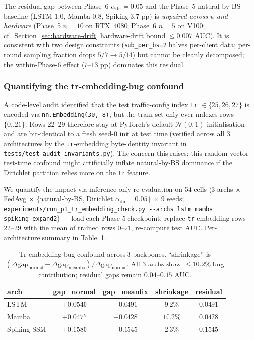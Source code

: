 \documentclass[journal]{IEEEtran}
\newcommand{\alphadir}{\ensuremath{\alpha_{\mathrm{dir}}}}
\begin{document}
The residual gap between Phase~6 $\alphadir = 0.05$ and the Phase~5 natural-by-BS baseline (LSTM $1.0$, Mamba $0.8$, Spiking $3.7$ pp) is \emph{unpaired across $n$ and hardware} (Phase~5 $n = 10$ on RTX~4080; Phase~6 $n = 5$ on V100; cf.\ Section~\ref{sec:hardware-drift} hardware-drift bound $\leq 0.007$ AUC). It is consistent with two design constraints (\lstinline|sub_per_bs=2| halves per-client data; per-round sampling fraction drops $5/7 \rightarrow 5/14$) but cannot be cleanly decomposed; the within-Phase-6 effect ($7$--$13$ pp) dominates this residual.

\subsubsection{Quantifying the tr-embedding-bug confound}\label{sec:tr-embedding-confound}

A code-level audit identified that the test traffic-config index \lstinline|tr| $\in \{25, 26, 27\}$ is encoded via \lstinline|nn.Embedding(30, 8)|, but the train set only ever indexes rows $\{0..21\}$. Rows 22--29 therefore stay at PyTorch's default $\mathcal{N}(0, 1)$ initialisation and are bit-identical to a fresh seed-0 init at test time (verified across all 3 architectures by the \lstinline|tr|-embedding byte-identity invariant in \lstinline|tests/test_audit_invariants.py|). The concern this raises: this random-vector test-time confound might artificially inflate natural-by-BS dominance if the Dirichlet partition relies more on the \lstinline|tr| feature.

We quantify the impact via inference-only re-evaluation on 54 cells (3 archs $\times$ FedAvg $\times$ \{natural-by-BS, Dirichlet $\alphadir = 0.05$\} $\times$ 9 seeds; \lstinline|experiments/run_p1_tr_embedding_check.py --archs lstm mamba spiking_expand2|) --- load each Phase 5 checkpoint, replace \lstinline|tr|-embedding rows 22--29 with the mean of trained rows 0--21, re-compute test AUC. Per-architecture summary in Table~\ref{tab:tr-embedding-shrinkage}.

\begin{table}[t]
\caption{Tr-embedding-bug confound across 3 backbones. ``shrinkage'' is $(\Delta\mathrm{gap}_{\mathrm{normal}} - \Delta\mathrm{gap}_{\mathrm{meanfix}}) / \Delta\mathrm{gap}_{\mathrm{normal}}$. All 3 archs show $\leq 10.2\%$ bug contribution; residual gaps remain $0.04$--$0.15$ AUC.}
\label{tab:tr-embedding-shrinkage}
\centering
\begin{tabular}{@{}lcccc@{}}
\toprule
arch & gap\_normal & gap\_meanfix & shrinkage & residual \\
\midrule
LSTM        & $+0.0540$ & $+0.0491$ & $9.2\%$  & $0.0491$ \\
Mamba       & $+0.0477$ & $+0.0428$ & $10.2\%$ & $0.0428$ \\
Spiking-SSM & $+0.1580$ & $+0.1545$ & $2.3\%$  & $0.1545$ \\
\bottomrule
\end{tabular}
\end{table}
\end{document}
